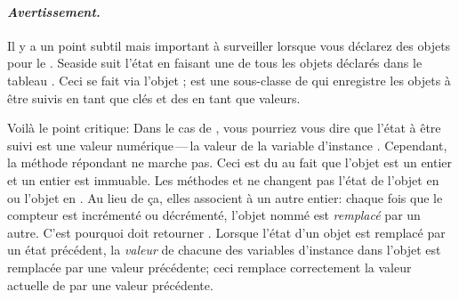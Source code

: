 \documentclass[a4paper,10pt,twoside]{book}
\begin{document}
\paragraph{\emph{Avertissement.}}
Il y a un point subtil mais important à surveiller lorsque vous
déclarez des objets pour le \backtracking.
Seaside suit l'état en faisant une 
de tous les objets déclarés dans le tableau .
Ceci se fait via l'objet
 ;  est une sous-classe
de  qui enregistre les objets à être suivis
en tant que clés et des  en tant que valeurs.


Voilà le point critique:
Dans le cas de , vous pourriez vous dire que l'état à
être suivi est une valeur numérique\,---\,la valeur de la variable
d'instance .
Cependant, la méthode  répondant  ne
marche pas.
Ceci est du au fait que l'objet  est un entier et un entier
est immuable.
Les méthodes  et  ne changent pas l'état de
l'objet  en  ou l'objet  en .
Au lieu de ça, elles associent  à un autre entier:
chaque fois que le compteur est incrémenté ou décrémenté, l'objet
nommé  est \emph{remplacé} par un autre.
C'est pourquoi  doit retourner .
Lorsque l'état d'un objet \mbox{} est remplacé par un
état précédent, la \emph{valeur} de chacune des variables d'instance
dans l'objet est remplacée par une valeur précédente; ceci remplace
correctement la valeur actuelle de  par une valeur
précédente.
\end{document}
